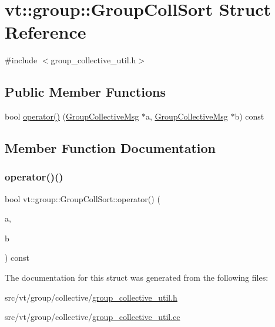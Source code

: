 \hypertarget{structvt_1_1group_1_1_group_coll_sort}{}\section{vt\+:\+:group\+:\+:Group\+Coll\+Sort Struct Reference}
\label{structvt_1_1group_1_1_group_coll_sort}


{\ttfamily \#include $<$group\+\_\+collective\+\_\+util.\+h$>$}

\subsection*{Public Member Functions}
\begin{DoxyCompactItemize}
\item 
bool \hyperlink{structvt_1_1group_1_1_group_coll_sort_ae65ccae1deb8a81472c1d18d57a2bd7e}{operator()} (\hyperlink{namespacevt_1_1group_a4c1183efe0185992fefb3ab38a55a8a7}{Group\+Collective\+Msg} $\ast$a, \hyperlink{namespacevt_1_1group_a4c1183efe0185992fefb3ab38a55a8a7}{Group\+Collective\+Msg} $\ast$b) const
\end{DoxyCompactItemize}


\subsection{Member Function Documentation}
\mbox{\label{structvt_1_1group_1_1_group_coll_sort_ae65ccae1deb8a81472c1d18d57a2bd7e}} 
\subsubsection{\texorpdfstring{operator()()}{operator()()}}
{\footnotesize\ttfamily bool vt\+::group\+::\+Group\+Coll\+Sort\+::operator() (\begin{DoxyParamCaption}\item[{\hyperlink{namespacevt_1_1group_a4c1183efe0185992fefb3ab38a55a8a7}{Group\+Collective\+Msg} $\ast$}]{a,  }\item[{\hyperlink{namespacevt_1_1group_a4c1183efe0185992fefb3ab38a55a8a7}{Group\+Collective\+Msg} $\ast$}]{b }\end{DoxyParamCaption}) const}



The documentation for this struct was generated from the following files\+:\begin{DoxyCompactItemize}
\item 
src/vt/group/collective/\hyperlink{group__collective__util_8h}{group\+\_\+collective\+\_\+util.\+h}\item 
src/vt/group/collective/\hyperlink{group__collective__util_8cc}{group\+\_\+collective\+\_\+util.\+cc}\end{DoxyCompactItemize}
